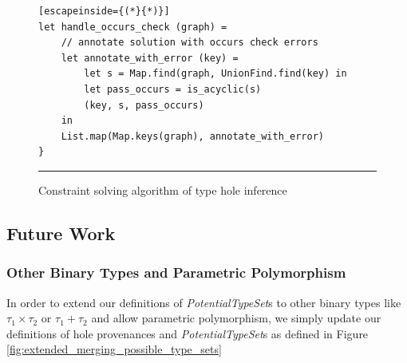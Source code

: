 \begin{figure}[h!]
\begin{lstlisting}[escapeinside={(*}{*)}]
let handle_occurs_check (graph) =
    // annotate solution with occurs check errors
    let annotate_with_error (key) =
        let s = Map.find(graph, UnionFind.find(key) in
        let pass_occurs = is_acyclic(s)
        (key, s, pass_occurs)
    in
    List.map(Map.keys(graph), annotate_with_error)
}
\end{lstlisting}
\vspace{-4px}
 \hrule
\caption{Constraint solving algorithm of type hole inference}
\label{fig:occurs_check}
\end{figure}

\subsection{Future Work}
\subsubsection{Other Binary Types and Parametric Polymorphism}
In order to extend our definitions of \emph{PotentialTypeSet}s to other binary types like $\tau_1 \times \tau_2$ or $\tau_1 + \tau_2$ and allow parametric polymorphism, we simply update our definitions of hole provenances and \emph{PotentialTypeSet}s as defined in Figure \ref{fig:extended_merging_possible_type_sets}


